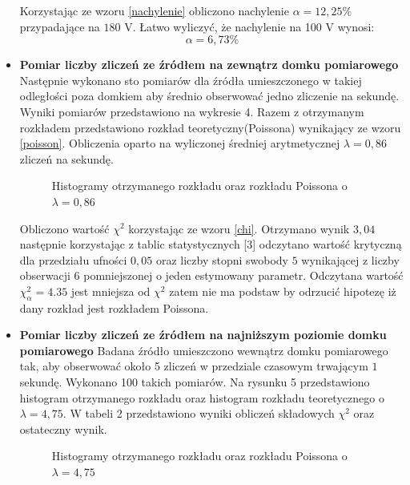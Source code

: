 \documentclass{article}
\begin{document}
\begin{itemize}
Korzystając ze wzoru \ref{nachylenie} obliczono nachylenie $\alpha = 12,25 \%$ przypadające na $180$ V. Łatwo wyliczyć, że nachylenie na 100 V wynosi:
\begin{equation*}
	\alpha = 6,73 \%
\end{equation*}
\item \textbf{Pomiar liczby zliczeń ze źródłem na zewnątrz domku pomiarowego}\\
Następnie wykonano sto pomiarów dla źródła umieszczonego w takiej odległości poza domkiem aby średnio obserwować jedno zliczenie na sekundę. Wyniki pomiarów przedstawiono na wykresie 4. Razem z otrzymanym rozkładem przedstawiono rozkład teoretyczny(Poissona) wynikający ze wzoru \ref{poisson}. Obliczenia oparto na wyliczonej średniej arytmetycznej $\lambda = 0,86$ zliczeń na sekundę.
\begin{figure}[h!]
	\fontsize{6}{8}\selectfont %
	\centering
	\resizebox{0.9\textwidth}{!}{}	
	\label{hist1}	
	\caption{Histogramy otrzymanego rozkładu oraz rozkładu Poissona o $\lambda = 0,86$}

\end{figure}

Obliczono wartość $\chi^2$ korzystając ze wzoru \ref{chi}. Otrzymano wynik $3,04$ następnie korzystając z tablic statystycznych [3] odczytano wartość krytyczną dla przedziału ufności $0,05$ oraz liczby stopni swobody $5$ wynikającej z liczby obserwacji $6$ pomniejszonej o jeden estymowany parametr. Odczytana wartość $\chi^2_\alpha = 4.35 $ jest mniejsza od $\chi^2$ zatem nie ma podstaw by odrzucić hipotezę iż dany rozkład jest rozkładem Poissona.

\item \textbf{Pomiar liczby zliczeń ze źródłem na najniższym poziomie domku pomiarowego}
Badana źródło umieszczono wewnątrz domku pomiarowego tak, aby obserwować około 5 zliczeń w przedziale czasowym trwającym $1$ sekundę. Wykonano 100 takich pomiarów. Na rysunku 5 przedstawiono histogram otrzymanego rozkładu oraz histogram rozkładu teoretycznego o $\lambda = 4,75$. W tabeli 2 przedstawiono wyniki obliczeń składowych $\chi^2$ oraz ostateczny wynik.


\begin{figure}[h!]
	\fontsize{6}{8}\selectfont %
	\centering
	\resizebox{0.8\textwidth}{!}{}
	
	\caption{Histogramy otrzymanego rozkładu oraz rozkładu Poissona o $\lambda = 4,75$}
	\label{hist2}
\end{figure}



\end{itemize}
\end{document}
